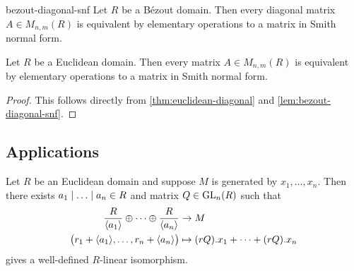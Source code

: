 \documentclass{styles/tufte}
\begin{document}
  \begin{lemma}{}{bezout-diagonal-snf}
    Let $R$ be a B\'ezout domain. Then every diagonal matrix $A \in M_{n,m}(R)$ is equivalent by elementary operations to a matrix in Smith normal form.
  \end{lemma}
  
  \begin{theorem}{}{}
    Let $R$ be a Euclidean domain. Then every matrix $A \in M_{n,m}(R)$ is equivalent by elementary operations to a matrix in Smith normal form.
  \end{theorem}
  \begin{proof}
    This follows directly from \cref{thm:euclidean-diagonal} and \cref{lem:bezout-diagonal-snf}.
  \end{proof}


\subsection{Applications}

  \begin{theorem}{}{}
    Let $R$ be an Euclidean domain and suppose $M$ is generated by $x_1, \dots, x_n$. Then there exists $a_1 \divides \dots \divides a_n \in R$ and matrix $Q \in \mathrm{GL}_n(R)$ such that
    \begin{align*}
      \frac{R}{\abrak{a_1}} \oplus \cdots \oplus \frac{R}{\abrak{a_n}} & \to M \\
      \left(r_1 + \abrak{a_1}, \dots, r_n + \abrak{a_n}\right) & \mapsto (rQ).x_1 + \dots + (rQ).x_n
    \end{align*}
    gives a well-defined $R$-linear isomorphism.
  \end{theorem}
\end{document}
